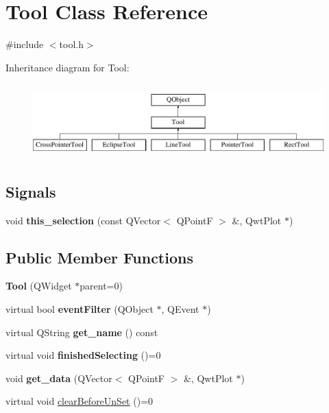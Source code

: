 \hypertarget{classTool}{}\section{Tool Class Reference}
\label{classTool}


{\ttfamily \#include $<$tool.\+h$>$}

Inheritance diagram for Tool\+:\begin{figure}[H]
\begin{center}
\leavevmode
\includegraphics[height=2.871795cm]{classTool}
\end{center}
\end{figure}
\subsection*{Signals}
\begin{DoxyCompactItemize}
\item 
\mbox{\label{classTool_a68dea3e4c911f3174176084d350865cc}} 
void {\bfseries this\+\_\+selection} (const Q\+Vector$<$ Q\+PointF $>$ \&, Qwt\+Plot $\ast$)
\end{DoxyCompactItemize}
\subsection*{Public Member Functions}
\begin{DoxyCompactItemize}
\item 
\mbox{\label{classTool_a1f72e991d5b5656fd532340b064f4ca5}} 
{\bfseries Tool} (Q\+Widget $\ast$parent=0)
\item 
\mbox{\label{classTool_a020bd5757a03ea7321848a3874f3a8cb}} 
virtual bool {\bfseries event\+Filter} (Q\+Object $\ast$, Q\+Event $\ast$)
\item 
\mbox{\label{classTool_aa30c64915020a71d0ea8650e8e966336}} 
virtual Q\+String {\bfseries get\+\_\+name} () const
\item 
\mbox{\label{classTool_a5cb18e4c28ab3d8d39535db5d2213c81}} 
virtual void {\bfseries finished\+Selecting} ()=0
\item 
\mbox{\label{classTool_a507adfcdafc818d9628b952001b93f3c}} 
void {\bfseries get\+\_\+data} (Q\+Vector$<$ Q\+PointF $>$ \&, Qwt\+Plot $\ast$)
\item 
virtual void \mbox{\hyperlink{classTool_a7d9e7d03f4a34d71850cbbfc16ca8532}{clear\+Before\+Un\+Set}} ()=0
\end{DoxyCompactItemize}
